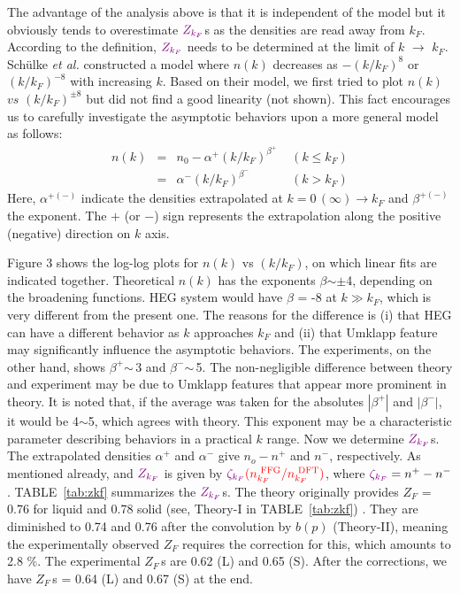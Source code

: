 \documentclass[twocolumn,showpacs,showkeys,fleqn,prl,superscriptaddress]{revtex4}%
\newcommand{\nn}[1]{\textnormal{ #1}}
\newcommand{\ii}[1]{\textit{#1}}
\begin{document}
The advantage of the analysis above is {\color{violet}that it is} independent of the model but it obviously tends to overestimate ${\color{violet}Z_{k_F}}$s as the densities are read away from $k_F$.
According to the definition, ${\color{violet}Z_{k_F}}$ needs to be determined at the limit of $k$ $\to$ $k_F$. 
Sch{\"u}lke \ii{et al.}\,\,constructed a model where $n(k)$ decreases as $-(k/k_F)^{8}$ or $(k/k_F)^{-8}$ with increasing $k$\cite{schulke96}.
Based on their model, we first tried to plot $n(k)$ $vs$ $(k/k_F)^{\pm 8}$ but did not find a good linearity (not shown).
This fact encourages us to carefully investigate the asymptotic behaviors upon a more general model as follows: 
\begin{eqnarray}
n(k) &=& n_0 - \alpha^{+}  (k/k_F)^{\beta^+}  \;\;\;\; (k \leq k_F)  \nonumber \\
&=&  \alpha^{-}  (k/k_F)^{\beta^-}  \;\;\;\;\;\;\;\;\;\;\;\; (k>k_F)
\end{eqnarray}
Here, $\alpha^{+(-)}$ indicate the densities extrapolated at ${k=0\,(\infty) \to k_F}$ and $\beta^{+(-)}$ the exponent.
The $+$ (or $-$) sign represents the extrapolation along the positive (negative) direction on $k$ axis.

Figure 3 shows the log-log plots for $n(k)$ vs $(k/k_F)$, on which linear fits are indicated together. 
Theoretical $n(k)$ has the exponents $\beta$$\sim\pm$4, depending on the broadening functions.
HEG system would have $\beta$ = -8 at $k \gg k_F$, which is very different from the present one.
The reasons for the difference is (i) that HEG can have a different behavior as $k$ approaches $k_F$ and (ii) that Umklapp feature may significantly influence the asymptotic behaviors.
The experiments, on the other hand, shows $\beta^+$$\sim\,$3 and $\beta^-$$\sim\,$5. 
The non-negligible difference between theory and experiment may be due to Umklapp features that appear more prominent in theory.
It is noted that, if the average was taken for the absolutes $| \beta^+ |$ and $| \beta^- |$, it would be 4$\sim$5, which agrees with theory.
This exponent may be a characteristic parameter describing behaviors in a practical $k$ range.
Now we determine ${\color{violet}Z_{k_F}}$s. 
The extrapolated densities $\alpha^+$ and $\alpha^-$ give $n_o - n^+$ and $n^-$, respectively.
As mentioned already,  and ${\color{violet}Z_{k_F}}$ is given by ${\color{violet}\zeta_{k_F}}{\color{red}(n_{k_F}^{\nn{FFG}}/n_{k_F}^{\nn{DFT}})}$, where ${\color{violet}\zeta_{k_F}}= n^+ - n^-$.   
TABLE~\ref{tab:zkf} summarizes the ${\color{violet}Z_{k_F}}$s. 
The theory originally provides $Z_F$ = 0.76 for liquid and 0.78 solid  (see, Theory-I in TABLE~\ref{tab:zkf}) .
They are diminished to 0.74 and 0.76 after the convolution by $b(p)$ (Theory-II), meaning the experimentally observed $Z_F$ requires the correction for this, which amounts to 2.8 \%.
The experimental $Z_F\,$s are 0.62 (L) and 0.65 (S). After the corrections, we have $Z_F\,$s = 0.64 (L) and 0.67 (S) at the end.    
\end{document}

